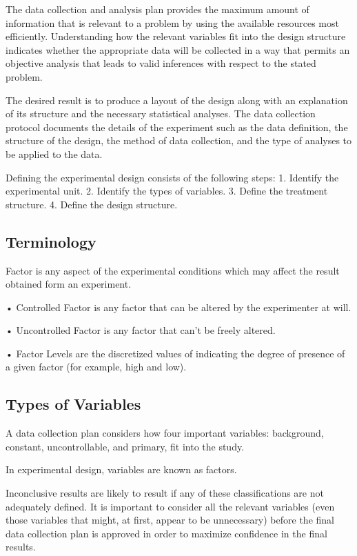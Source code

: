 \documentclass[a4paper,12pt]{article}
\begin{document}
The data collection and analysis plan provides the maximum amount of information that is relevant to a problem by using the available resources most efficiently. Understanding how the relevant variables fit into the design structure indicates whether the appropriate data will be collected in a way that permits an objective analysis that leads to valid inferences with respect to the stated problem. 



The desired result is to produce a layout of the design along with an explanation of its structure and the necessary statistical analyses. The data collection protocol documents the details of the experiment such as the data definition, the structure of the design, the method of data collection, and the type of analyses to be applied to the data.

Defining the experimental design consists of the following steps:
1. Identify the experimental unit.
2. Identify the types of variables.
3. Define the treatment structure.
4. Define the design structure.

\subsection{Terminology}
Factor is any aspect of the experimental conditions which may affect the result obtained form an experiment. 

•	Controlled Factor is any factor that can be altered by the experimenter at will.

•	Uncontrolled Factor is any factor that can’t be freely altered.

•	Factor Levels are the discretized values of indicating the degree of presence of a given factor (for example, high and low).


\subsection{Types of Variables}

A data collection plan considers how four important variables: background, constant, uncontrollable, and primary, fit into the study. 

In experimental design, variables are known as factors.

Inconclusive results are likely to result if any of these classifications are not adequately defined. It is important to consider all the relevant
variables (even those variables that might, at first, appear to be unnecessary) before the final data collection plan is approved in order to maximize confidence in the final results.
\end{document}
